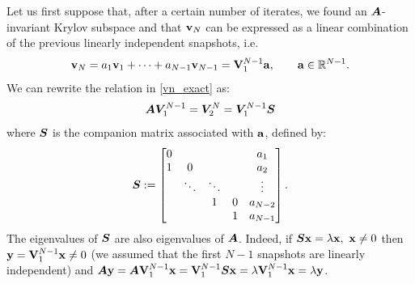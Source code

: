 Let us first suppose that, after a certain number of iterates, we found an $\vb*{A}$-invariant Krylov subspace and that $\vb{v}_N$ can be expressed as a linear combination of the previous linearly independent snapshots, i.e.
\begin{equation}
    \label{vn_exact}
    \vb{v}_N = a_1 \vb{v}_1 + \dots + a_{N-1} \vb{v}_{N-1} = \vb{V}_1^{N-1}\vb{a}, \qquad \vb{a}\in\mathbb{R}^{N-1}.
\end{equation}
We can rewrite the relation in \eqref{vn_exact} as:
\begin{equation*}
    \vb*{A}\vb*{V}_1^{N-1} = \vb*{V}_2^{N} = \vb*{V}_1^{N-1}\vb*{S}
\end{equation*}
where $\vb*{S}$ is the companion matrix associated with $\vb{a}$, defined by:
\begin{equation}
    \label{S_definition}
    \vb*{S} :=
   \begin{bmatrix}
   0     &        &       &      & a_1 \\
   1     & 0      &       &      & a_2 \\
         & \ddots & \ddots&      & \vdots \\ 
         &        & 1     & 0    & a_{N-2} \\
         &        &       & 1    & a_{N-1} \\
   \end{bmatrix}.
\end{equation}
The eigenvalues of $\vb*{S}$ are also eigenvalues of $\vb*{A}$. Indeed, if $\vb*{S}\vb{x} = \lambda \vb{x}, \,\, \vb{x}\neq 0$ then $\vb{y} = \vb{V}_1^{N-1}\vb{x}\neq 0$ (we assumed that the first $N-1$ snapshots are linearly independent) and $\vb*{A}\vb{y} = \vb*{A}\vb{V}_1^{N-1}\vb{x} = \vb{V}_1^{N-1}\vb*{S}\vb{x} = \lambda \vb{V}_1^{N-1}\vb{x} = \lambda \vb{y}$.

